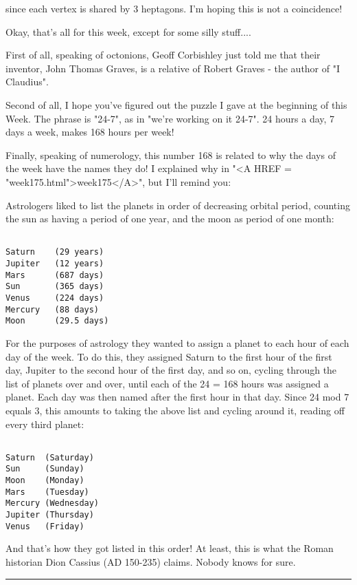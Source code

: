 since each vertex is shared by 3 heptagons.  I'm hoping this is
not a coincidence!  

Okay, that's all for this week, except for some silly stuff....

First of all, speaking of octonions, Geoff Corbishley just told me 
that their inventor, John Thomas Graves, is a relative of Robert 
Graves - the author of "I Claudius". 

Second of all, I hope you've figured out the puzzle I gave at the 
beginning of this Week.  The phrase is "24-7", as in "we're working 
on it 24-7".  24 hours a day, 7 days a week, makes 168 hours per week!

Finally, speaking of numerology, this number 168 is related to why the 
days of the week have the names they do!  I explained why in "<A HREF = "week175.html">week175</A>", 
but I'll remind you:

Astrologers liked to list the planets in order of decreasing orbital 
period, counting the sun as having a period of one year, and the moon 
as period of one month:


\begin{verbatim}

Saturn    (29 years)  
Jupiter   (12 years) 
Mars      (687 days)  
Sun       (365 days)
Venus     (224 days)
Mercury   (88 days)
Moon      (29.5 days)
\end{verbatim}
    
For the purposes of astrology they wanted to assign a planet to each 
hour of each day of the week.  To do this, they assigned Saturn to 
the first hour of the first day, Jupiter to the second hour of the 
first day, and so on, cycling through the list of planets over and 
over, until each of the 24  = 168 hours was assigned a planet.  
Each day was then named after the first hour in that day.  Since 
24 mod 7 equals 3, this amounts to taking the above list and cycling
around it, reading off every third planet:
 

\begin{verbatim}

Saturn  (Saturday)  
Sun     (Sunday)   
Moon    (Monday)  
Mars    (Tuesday)  
Mercury (Wednesday)
Jupiter (Thursday)
Venus   (Friday)
\end{verbatim}
    

And that's how they got listed in this order!  At least, this is what 
the Roman historian Dion Cassius (AD 150-235) claims.  Nobody knows for
sure.


\par\noindent\rule{\textwidth}{0.4pt}

